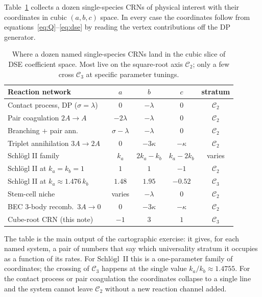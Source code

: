 \documentclass[11pt,a4paper]{article}
\newcommand{\Ck}{\mathcal{C}}
\theoremstyle{plain}
\theoremstyle{remark}
\begin{document}
Table~\ref{tab:crn_landscape} collects a dozen single-species
CRNs of physical interest with their coordinates in cubic
$(a,b,c)$ space.  In every case the coordinates follow from
equations~\eqref{eq:Q}--\eqref{eq:dse} by reading the vertex
contributions off the DP generator.

\begin{table}[h]
\centering
\small
\begin{tabular}{lcccc}
\toprule
Reaction network & $a$ & $b$ & $c$ & stratum \\
\midrule
Contact process, DP ($\sigma{=}\lambda$)~\citep{Tauber,Odor2004} & $0$ & $-\lambda$ & $0$ & $\Ck_{2}$ \\
Pair coagulation $2A\!\to\!A$~\citep{Tauber} & $-2\lambda$ & $-\lambda$ & $0$ & $\Ck_{2}$ \\
Branching $+$ pair ann.~\citep{Tauber} & $\sigma{-}\lambda$ & $-\lambda$ & $0$ & $\Ck_{2}$ \\
Triplet annihilation $3A\!\to\!2A$~\citep{Odor2004} & $0$ & $-3\kappa$ & $-\kappa$ & $\Ck_{2}$ \\
Schlögl II family~\citep{Schlogl1972,Prakash2024} & $k_{a}$ & $2k_{a}{-}k_{b}$ & $k_{a}{-}2k_{b}$ & varies \\
\quad Schlögl II at $k_{a}{=}k_{b}{=}1$ & $1$ & $1$ & $-1$ & $\Ck_{2}$ \\
\quad Schlögl II at $k_{a}\!\approx\! 1.476\,k_{b}$ & $1.48$ & $1.95$ & $-0.52$ & $\Ck_{3}$ \\
Stem-cell niche~\citep{ClaytonEtAl2007} & varies & $-\lambda$ & $0$ & $\Ck_{2}$ \\
BEC 3-body recomb.\ $3A\!\to\!0$~\citep{BurtWieman1997} & $0$ & $-3\kappa$ & $-\kappa$ & $\Ck_{2}$ \\
Cube-root CRN (this note) & $-1$ & $3$ & $1$ & $\Ck_{3}$ \\
\bottomrule
\end{tabular}
\caption{Where a dozen named single-species CRNs land in the
cubic slice of DSE coefficient space.  Most live on the
square-root axis $\Ck_{2}$; only a few cross $\Ck_{3}$ at specific
parameter tunings.}
\label{tab:crn_landscape}
\end{table}

The table is the main output of the cartographic exercise: it
gives, for each named system, a pair of numbers that say
which universality stratum it occupies as a function of its
rates.  For Schlögl~II this is a one-parameter family of
coordinates; the crossing of $\Ck_{3}$ happens at the single
value $k_{a}/k_{b}\approx 1.4755$.  For the contact process or
pair coagulation the coordinates collapse to a single line
and the system cannot leave $\Ck_{2}$ without a new reaction
channel added.
\end{document}
